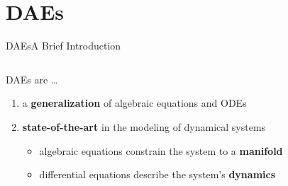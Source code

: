 
\section{\aclp{DAE}}

\begin{frame}{\aclp{DAE}}{A Brief Introduction}
  \begin{columns}
    \begin{column}{0.65\textwidth}
      \acsp{DAE} are \dots
      \begin{enumerate}[<+->]
        \item a \textbf{generalization} of algebraic equations and \acsp{ODE} \\
        \item \textbf{state-of-the-art} in the modeling of dynamical systems \\
        \begin{itemize}
          \item<2-> algebraic equations constrain the system to a \textbf{manifold} \\
          \item<2-> differential equations describe the system's \textbf{dynamics}
        \end{itemize}
      \end{enumerate}
    \end{column}

\end{columns}
\end{frame}
